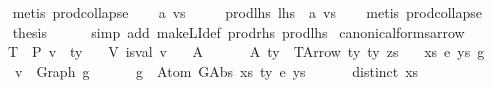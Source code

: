 \begin{isabellebody}
\ \ \isamarkupfalse%
\ {\isacharparenleft}{\kern0pt}metis\ prod{\isachardot}{\kern0pt}collapse{\isacharparenright}{\kern0pt}\isanewline
\ \ \isamarkupfalse%
\ a\ vs\ \isanewline
\ \ \ \ prod{\isacharunderscore}{\kern0pt}lhs{\isacharcolon}{\kern0pt}\ {\isachardoublequoteopen}lhs\ {\isacharequal}{\kern0pt}\ {\isacharparenleft}{\kern0pt}a{\isacharcomma}{\kern0pt}\ vs{\isacharparenright}{\kern0pt}{\isachardoublequoteclose}\isanewline
\ \ \isamarkupfalse%
\ {\isacharparenleft}{\kern0pt}metis\ prod{\isachardot}{\kern0pt}collapse{\isacharparenright}{\kern0pt}\isanewline
\ \ \isamarkupfalse%
\ {\isacharquery}{\kern0pt}thesis\isanewline
\ \ \ \ \isamarkupfalse%
\ {\isacharparenleft}{\kern0pt}simp\ add{\isacharcolon}{\kern0pt}\ make{\isacharunderscore}{\kern0pt}LI{\isacharunderscore}{\kern0pt}def\ prod{\isacharunderscore}{\kern0pt}rhs\ prod{\isacharunderscore}{\kern0pt}lhs{\isacharparenright}{\kern0pt}\isanewline
{}\isamarkupfalse%
%
\endisatagproof
{\isafoldproof}%
%
\isadelimproof
\isanewline
%
\endisadelimproof
\isanewline
{}\isamarkupfalse%
\ canonical{\isacharunderscore}{\kern0pt}forms{\isacharunderscore}{\kern0pt}arrow{\isacharcolon}{\kern0pt}\isanewline
\ \ \ T{\isacharcolon}{\kern0pt}\ {\isachardoublequoteopen}{\isasymGamma}\ {\isasymturnstile}{\isacharbraceleft}{\kern0pt}P{\isacharbraceright}{\kern0pt}\ v\ {\isacharcolon}{\kern0pt}\ ty{\isachardoublequoteclose}\isanewline
\ \ \ V{\isacharcolon}{\kern0pt}\ {\isachardoublequoteopen}is{\isacharunderscore}{\kern0pt}val\ v{\isachardoublequoteclose}\isanewline
\ \ \ A{}{\isacharcolon}{\kern0pt}\ {\isachardoublequoteopen}{\isasymGamma}\ {\isacharequal}{\kern0pt}\ {\isacharbrackleft}{\kern0pt}{\isacharbrackright}{\kern0pt}{\isachardoublequoteclose}\isanewline
\ \ \ A{}{\isacharcolon}{\kern0pt}\ {\isachardoublequoteopen}ty\ {\isacharequal}{\kern0pt}\ TArrow\ ty{}\ ty{}\ zs{\isachardoublequoteclose}\isanewline
\ \ \ {\isachardoublequoteopen}{\isasymexists}xs\ e{\isacharprime}{\kern0pt}\ ys\ g{\isachardot}{\kern0pt}\isanewline
\ \ \ \ {\isacharparenleft}{\kern0pt}v\ {\isacharequal}{\kern0pt}\ Graph\ g\ {\isasymand}\isanewline
\ \ \ \ \ g\ {\isasymsimeq}\ Atom\ {\isacharparenleft}{\kern0pt}GAbs\ xs\ ty{}\ e{\isacharprime}{\kern0pt}{\isacharparenright}{\kern0pt}\ ys\ {\isasymand}\isanewline
\ \ \ \ \ distinct\ xs\ {\isasymand}\isanewline

\end{isabellebody}
